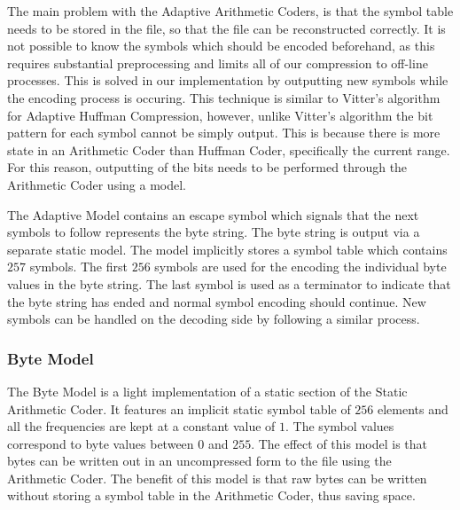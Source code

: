 \documentclass[a4paper,11pt]{report}
\begin{document}

The main problem with the Adaptive Arithmetic Coders, is that the symbol table needs to be stored in the file, so that the file can be reconstructed correctly. It is not possible to know the symbols which should be encoded beforehand, as this requires substantial preprocessing and limits all of our compression to off-line processes. This is solved in our implementation by outputting new symbols while the encoding process is occuring. This technique is similar to Vitter's algorithm for Adaptive Huffman Compression, however, unlike Vitter's algorithm the bit pattern for each symbol cannot be simply output. This is because there is more state in an Arithmetic Coder than Huffman Coder, specifically the current range. For this reason, outputting of the bits needs to be performed through the Arithmetic Coder using a model. 

The Adaptive Model contains an escape symbol which signals that the next symbols to follow represents the byte string. The byte string is output via a separate static model. The model implicitly stores a symbol table which contains $257$ symbols. The first $256$ symbols are used for the encoding the individual byte values in the byte string. The last symbol is used as a terminator to indicate that the byte string has ended and normal symbol encoding should continue. New symbols can be handled on the decoding side by following a similar process.


\subsubsection{Byte Model}

The Byte Model is a light implementation of a static section of the Static Arithmetic Coder. It features an implicit static symbol table of $256$ elements and all the frequencies are kept at a constant value of $1$. The symbol values correspond to byte values between $0$ and $255$. The effect of this model is that bytes can be written out in an uncompressed form to the file using the Arithmetic Coder. The benefit of this model is that raw bytes can be written without storing a symbol table in the Arithmetic Coder, thus saving space. 
\end{document}
